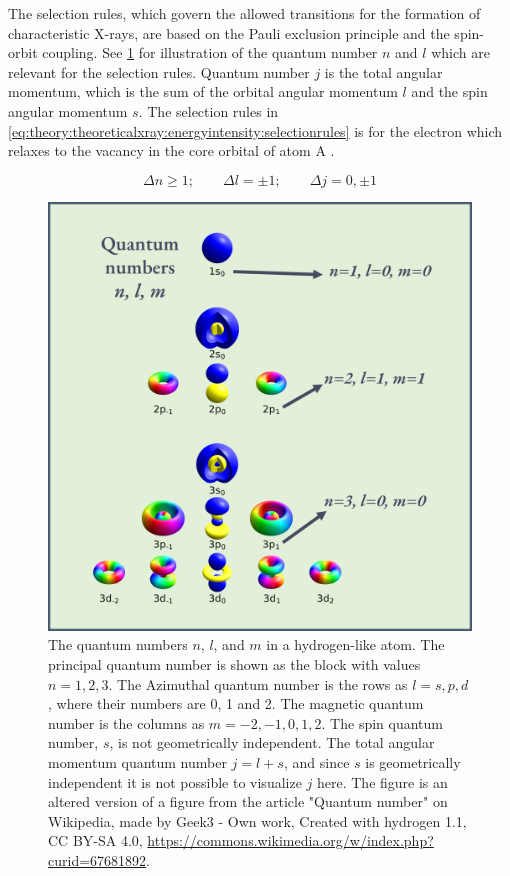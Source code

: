 The selection rules, which govern the allowed transitions for the formation of characteristic X-rays, are based on the Pauli exclusion principle and the spin-orbit coupling.
See \cref{fig:theory:theoreticalxray:energyintensity:quantumnumbers} for illustration of the quantum number $n$ and $l$ which are relevant for the selection rules.
Quantum number $j$ is the total angular momentum, which is the sum of the orbital angular momentum $l$ and the spin angular momentum $s$.
The selection rules in \cref{eq:theory:theoreticalxray:energyintensity:selectionrules} is for the electron which relaxes to the vacancy in the core orbital of atom A \cite[Sec. 8.2.2.2]{hollas_modern_2004}.

\begin{equation}
    \label{eq:theory:theoreticalxray:energyintensity:selectionrules}
    \Delta n \ge 1;\qquad \Delta l  = \pm 1;\qquad \Delta j = 0, \pm 1
\end{equation}

\begin{figure}[p]
    \centering
    \includegraphics[width=0.8\linewidth]{figures/wikipedia-quantum-numbers-n-l-j.png}
    \caption{
        The quantum numbers $n$, $l$, and $m$ in a hydrogen-like atom.
        The principal quantum number is shown as the block with values $n= 1, 2, 3$.
        The Azimuthal quantum number is the rows as $l = s, p, d$, where their numbers are 0, 1 and 2.
        The magnetic quantum number is the columns as $m = -2, -1, 0, 1, 2 $.
        The spin quantum number, $s$, is not geometrically independent.
        The total angular momentum quantum number $j = l + s$, and since $s$ is geometrically independent it is not possible to visualize $j$ here.
        The figure is an altered version of a figure from the article "Quantum number" on Wikipedia, made by Geek3 - Own work, Created with hydrogen 1.1, CC BY-SA 4.0, \url{https://commons.wikimedia.org/w/index.php?curid=67681892}.
    }
    \label{fig:theory:theoreticalxray:energyintensity:quantumnumbers}
\end{figure}


